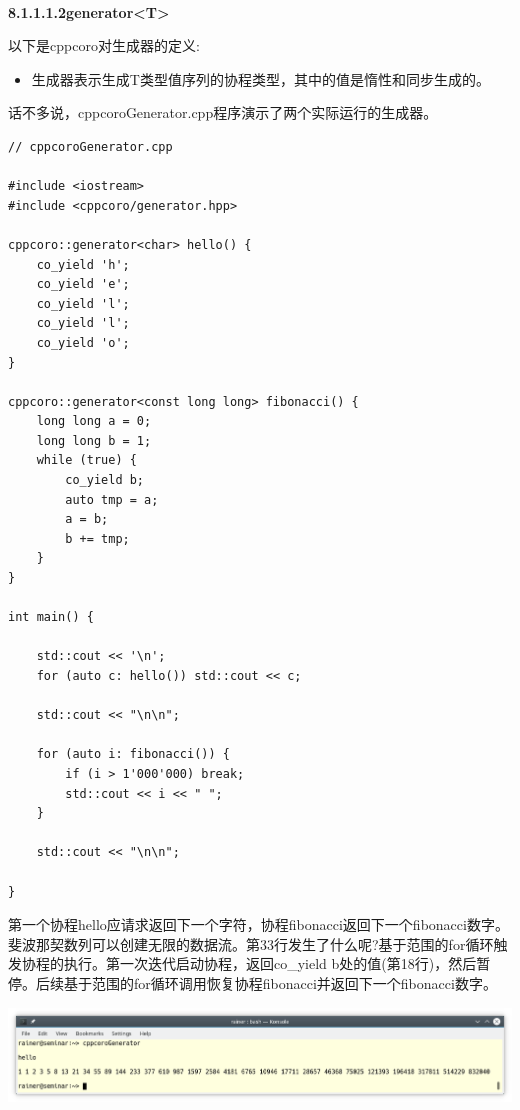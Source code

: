 \hspace*{\fill} \\ %
\noindent
\textbf{8.1.1.1.2\hspace{0.2cm}generator<T>}

以下是cppcoro对生成器的定义:

\begin{itemize}
\item 
生成器表示生成T类型值序列的协程类型，其中的值是惰性和同步生成的。
\end{itemize}

话不多说，cppcoroGenerator.cpp程序演示了两个实际运行的生成器。

\begin{lstlisting}[style=styleCXX]
// cppcoroGenerator.cpp

#include <iostream>
#include <cppcoro/generator.hpp>

cppcoro::generator<char> hello() {
	co_yield 'h';
	co_yield 'e';
	co_yield 'l';
	co_yield 'l';
	co_yield 'o';
}

cppcoro::generator<const long long> fibonacci() {
	long long a = 0;
	long long b = 1;
	while (true) {
		co_yield b;
		auto tmp = a;
		a = b;
		b += tmp;
	}
}

int main() {

	std::cout << '\n';
	for (auto c: hello()) std::cout << c;
	
	std::cout << "\n\n";
	
	for (auto i: fibonacci()) {
		if (i > 1'000'000) break;
		std::cout << i << " ";
	}
	
	std::cout << "\n\n";

}
\end{lstlisting}

第一个协程hello应请求返回下一个字符，协程fibonacci返回下一个fibonacci数字。斐波那契数列可以创建无限的数据流。第33行发生了什么呢?基于范围的for循环触发协程的执行。第一次迭代启动协程，返回co\_yield b处的值(第18行)，然后暂停。后续基于范围的for循环调用恢复协程fibonacci并返回下一个fibonacci数字。

\begin{center}
\includegraphics[width=1.0\textwidth]{content/5/chapter8/images/2.png}\\
\end{center}

